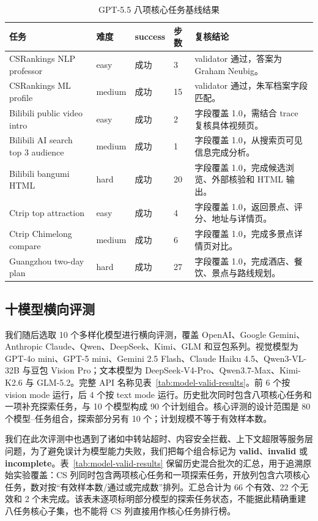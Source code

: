 \begin{table}[H]
  \centering
  \caption{GPT-5.5 八项核心任务基线结果}
  \label{tab:gpt55-baseline}
  \small
  \begin{tabularx}{\textwidth}{p{}p{}p{}p{}Y}
    \toprule
    任务 & 难度 & success & 步数 & 复核结论 \\
    \midrule
    CSRankings NLP professor & easy & 成功 & 3 & validator 通过，答案为 Graham Neubig。\\
    CSRankings ML profile & medium & 成功 & 15 & validator 通过，朱军档案字段匹配。\\
    Bilibili public video intro & easy & 成功 & 2 & 字段覆盖 1.0，需结合 trace 复核具体视频页。\\
    Bilibili AI search top 3 audience & medium & 成功 & 1 & 字段覆盖 1.0，从搜索页可见信息完成分析。\\
    Bilibili bangumi HTML & hard & 成功 & 20 & 字段覆盖 1.0，完成候选浏览、外部核验和 HTML 输出。\\
    Ctrip top attraction & easy & 成功 & 4 & 字段覆盖 1.0，返回景点、评分、地址与详情页。\\
    Ctrip Chimelong compare & medium & 成功 & 6 & 字段覆盖 1.0，完成多景点详情页对比。\\
    Guangzhou two-day plan & hard & 成功 & 27 & 字段覆盖 1.0，完成酒店、餐饮、景点与路线规划。\\
    \bottomrule
  \end{tabularx}
\end{table}

\subsection{十模型横向评测}

我们随后选取 10 个多样化模型进行横向评测，覆盖 OpenAI、Google Gemini、Anthropic Claude、Qwen、DeepSeek、Kimi、GLM 和豆包系列。视觉模型为 GPT-4o mini、GPT-5 mini、Gemini 2.5 Flash、Claude Haiku 4.5、Qwen3-VL-32B 与豆包 Vision Pro；文本模型为 DeepSeek-V4-Pro、Qwen3.7-Max、Kimi-K2.6 与 GLM-5.2。完整 API 名称见表~\ref{tab:model-valid-results}。前 6 个按 vision mode 运行，后 4 个按 text mode 运行。历史批次同时包含八项核心任务和一项补充探索任务，与 10 个模型构成 90 个计划组合。核心评测的设计范围是 80 个模型--任务组合，探索部分另有 10 个；计划规模不等于有效样本数。

我们在此次评测中也遇到了诸如中转站超时、内容安全拦截、上下文超限等服务层问题，为了避免误计为模型能力失败，我们把每个组合标记为 \textbf{valid}、\textbf{invalid} 或 \textbf{incomplete}。表~\ref{tab:model-valid-results} 保留历史混合批次的汇总，用于追溯原始实验覆盖：CS 列同时包含两项核心任务和一项探索任务，开放列包含六项核心任务，数对按“有效样本数/通过或完成数”排列。汇总合计为 66 个有效、22 个无效和 2 个未完成。该表未逐项标明部分模型的探索任务状态，不能据此精确重建八任务核心子集，也不能将 CS 列直接用作核心任务排行榜。

